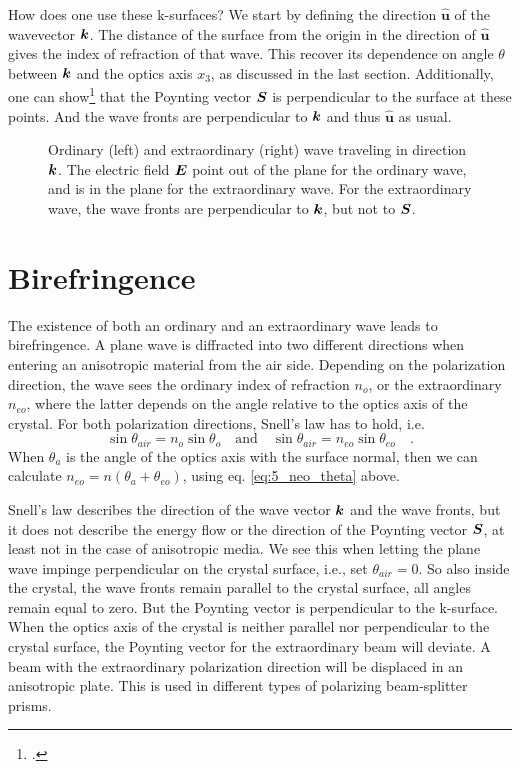 How does one use these k-surfaces? We start by defining the direction $\boldsymbol{\hat{u}}$ of the wavevector $\boldsymbol{k}$. The distance of the surface from the origin in the direction of $\boldsymbol{\hat{u}}$ gives the index of refraction of that wave. This recover its dependence on angle $\theta$ between $\boldsymbol{k}$ and the optics axis $x_3$, as discussed in the last section. Additionally, one can show\footcite{SalehTeich1991} that the Poynting vector $\boldsymbol{S}$ is perpendicular to the surface at these points. And the wave fronts are perpendicular to $\boldsymbol{k}$ and thus $\boldsymbol{\hat{u}}$ as usual.

\begin{figure}
    \caption{Ordinary (left) and extraordinary (right) wave traveling in direction $\boldsymbol{k}$. The electric field $\boldsymbol{E}$ point out of the plane for the ordinary wave, and is in the plane for the extraordinary wave. For the extraordinary wave, the wave fronts are perpendicular to $\boldsymbol{k}$, but not to $\boldsymbol{S}$.}
\end{figure}

\section{Birefringence}

The existence of both an ordinary and an extraordinary wave leads to birefringence. A plane wave is diffracted into two different directions when entering an anisotropic material from the air side. Depending on the polarization direction, the wave sees the ordinary index of refraction $n_o$, or the extraordinary $n_{eo}$, where the latter depends on the  angle relative to the optics axis of the crystal. For both polarization directions, Snell's law has to hold, i.e.
\begin{equation}
    \sin \theta_{air} = n_o \sin \theta_o \quad \text{and} \quad   \sin \theta_{air} = n_{eo} \sin \theta_{eo}  \quad .
\end{equation}
When $\theta_a$ is the angle of the optics axis with the surface normal, then we can calculate $n_{eo} = n(\theta_a + \theta_{eo})$, using eq.     \ref{eq:5_neo_theta} above.

Snell's law describes the direction of the wave vector $\boldsymbol{k}$ and the wave fronts, but it does not describe the energy flow or the direction of the Poynting vector $\boldsymbol{S}$, at least not in the case of anisotropic media. We see this when letting the plane wave impinge perpendicular on the crystal surface, i.e., set $\theta_{air} = 0$. So also inside the crystal, the wave fronts remain parallel to the crystal surface, all angles remain equal to zero. But the Poynting vector is perpendicular to the k-surface. When the optics axis of the crystal is neither parallel nor perpendicular to the crystal surface, the Poynting vector for the extraordinary beam will deviate. A beam with the extraordinary polarization direction will be displaced in an anisotropic plate. This is used in different types of polarizing beam-splitter prisms.



